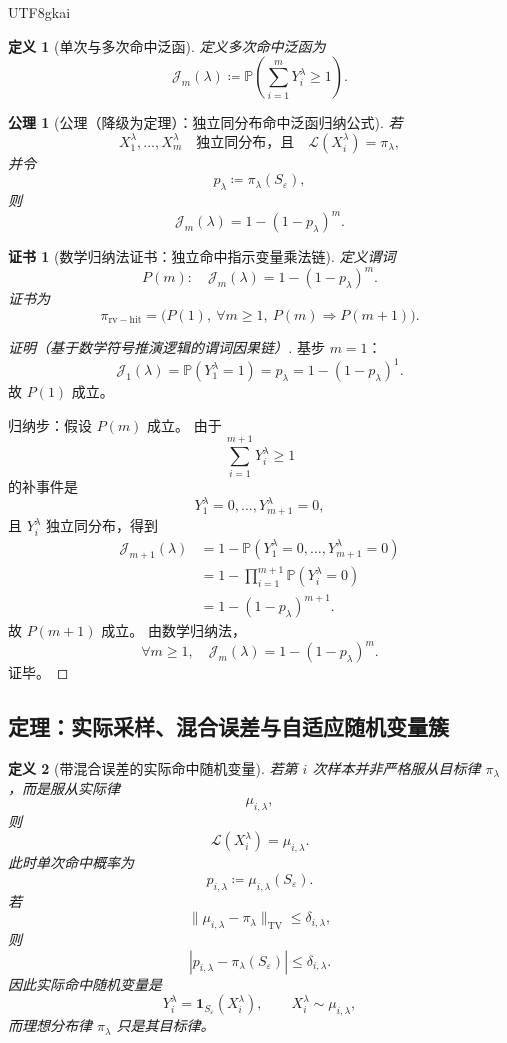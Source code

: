 \documentclass[12pt]{article}
\newtheorem{definition}{定义}[section]
\newtheorem{axiom}{公理}[section]
\newtheorem{Certificate}{证书}[section]
\newcommand{\DefEq}{\coloneqq}
\newcommand{\TV}{\mathrm{TV}}
\begin{document}
\begin{CJK*}{UTF8}{gkai}
\begin{definition}[单次与多次命中泛函]
定义多次命中泛函为
\[
  \mathcal J_m(\lambda)
  \DefEq
  \mathbb P\left(
  \sum_{i=1}^{m}Y_i^\lambda\ge1
  \right).
\]
\end{definition}

\begin{axiom}[公理（降级为定理）：独立同分布命中泛函归纳公式]
\label{ax:tex55-rv-iid-hit-functional}
若
\[
  X_1^\lambda,\ldots,X_m^\lambda
  \quad\text{独立同分布，且}\quad
  \mathcal L(X_i^\lambda)=\pi_\lambda,
\]
并令
\[
  p_\lambda\DefEq\pi_\lambda(S_\varepsilon),
\]
则
\[
  \mathcal J_m(\lambda)
  =
  1-(1-p_\lambda)^m.
\]
\end{axiom}

\begin{Certificate}[数学归纳法证书：独立命中指示变量乘法链]
\label{cert:tex55-rv-iid-hit-functional}
定义谓词
\[
  P(m):\quad
  \mathcal J_m(\lambda)=1-(1-p_\lambda)^m.
\]
证书为
\[
  \pi_{\mathrm{rv-hit}}
  =
  \bigl(P(1),\ \forall m\ge1,\ P(m)\Rightarrow P(m+1)\bigr).
\]
\end{Certificate}

\begin{proof}[证明（基于数学符号推演逻辑的谓词因果链）]
基步 \(m=1\)：
\[
  \mathcal J_1(\lambda)
  =
  \mathbb P(Y_1^\lambda=1)
  =
  p_\lambda
  =
  1-(1-p_\lambda)^1.
\]
故 \(P(1)\) 成立。

归纳步：假设 \(P(m)\) 成立。
由于
\[
  \sum_{i=1}^{m+1}Y_i^\lambda\ge1
\]
的补事件是
\[
  Y_1^\lambda=0,\ldots,Y_{m+1}^\lambda=0,
\]
且 \(Y_i^\lambda\) 独立同分布，得到
\[
\begin{aligned}
  \mathcal J_{m+1}(\lambda)
  &=
  1-\mathbb P(Y_1^\lambda=0,\ldots,Y_{m+1}^\lambda=0)\\
  &=
  1-\prod_{i=1}^{m+1}\mathbb P(Y_i^\lambda=0)\\
  &=
  1-(1-p_\lambda)^{m+1}.
\end{aligned}
\]
故 \(P(m+1)\) 成立。
由数学归纳法，
\[
  \forall m\ge1,\quad
  \mathcal J_m(\lambda)=1-(1-p_\lambda)^m.
\]
证毕。
\end{proof}

\subsection{定理：实际采样、混合误差与自适应随机变量簇}
\label{subsec:tex55-adaptive-rv-theorems}

\begin{definition}[带混合误差的实际命中随机变量]
\label{def:tex55-mixing-rv}
若第 \(i\) 次样本并非严格服从目标律 \(\pi_\lambda\)，而是服从实际律
\[
  \mu_{i,\lambda},
\]
则
\[
  \mathcal L(X_i^\lambda)=\mu_{i,\lambda}.
\]
此时单次命中概率为
\[
  p_{i,\lambda}
  \DefEq
  \mu_{i,\lambda}(S_\varepsilon).
\]
若
\[
  \|\mu_{i,\lambda}-\pi_\lambda\|_{\TV}
  \le
  \delta_{i,\lambda},
\]
则
\[
  |p_{i,\lambda}-\pi_\lambda(S_\varepsilon)|
  \le
  \delta_{i,\lambda}.
\]
因此实际命中随机变量是
\[
  Y_i^\lambda
  =
  \mathbf 1_{S_\varepsilon}(X_i^\lambda),
  \qquad
  X_i^\lambda\sim\mu_{i,\lambda},
\]
而理想分布律 \(\pi_\lambda\) 只是其目标律。
\end{definition}


\end{CJK*}
\end{document}
